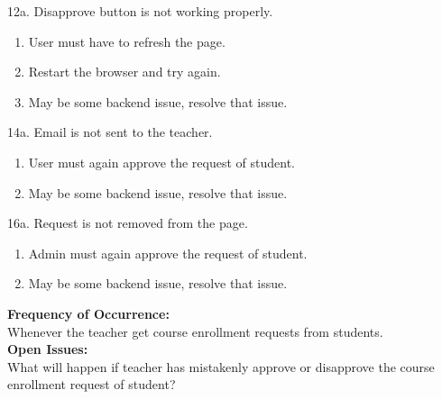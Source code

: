 \documentclass[12pt]{article}
\begin{document}
12a. Disapprove button is not working properly.
\begin{enumerate}
\item User must have to refresh the page.
\item Restart the browser and try again.
\item May be some backend issue, resolve that issue.
\end{enumerate}
14a. Email is not sent to the teacher.
\begin{enumerate}
\item User must again approve the request of student.
\item May be some backend issue, resolve that issue.
\end{enumerate}
16a. Request is not removed from the page.
\begin{enumerate}
\item Admin must again approve the request of student.
\item May be some backend issue, resolve that issue.
\end{enumerate}
\textbf{Frequency of Occurrence:}\\
Whenever the teacher get course enrollment requests from students.
\\
\textbf{Open Issues:}\\
What will happen if teacher has mistakenly approve or disapprove the course enrollment request of student?
\end{document}
